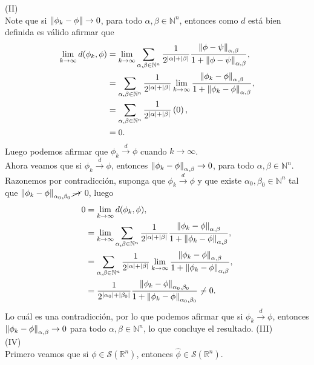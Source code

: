 \begin{homeworkProblem}
\begin{solution}
    (II)\\
    Note que si $\left\|\phi_{k}-\phi\right\|\to 0$, para todo $\alpha,\beta\in\mathbb{N}^{n}$, entonces como $d$ está bien definida es válido afirmar que
    \begin{align*}
      \lim_{k \to \infty}d(\phi_{k},\phi)&=\lim_{k \to \infty}\sum_{\alpha,\beta\in\mathbb{N}^{n}}\frac{1}{2^{|\alpha|+|\beta|}}\frac{\left\|\phi-\psi\right\|_{\alpha,\beta}}{1+\left\|\phi-\psi\right\|_{\alpha,\beta}},\\
      &=\sum_{\alpha,\beta\in\mathbb{N}^{n}}\frac{1}{2^{|\alpha|+|\beta|}}\lim_{k \to \infty}\frac{\left\|\phi_{k}-\phi\right\|_{\alpha,\beta}}{1+\left\|\phi_{k}-\phi\right\|_{\alpha,\beta}},\\
      &=\sum_{\alpha,\beta\in\mathbb{N}^{n}}\frac{1}{2^{|\alpha|+|\beta|}}\left( 0 \right),\\
      &=0.
    \end{align*}
    Luego podemos afirmar que $\phi_{k}\overset{d}{\to}\phi$ cuando $k\to\infty$.\\
    Ahora veamos que si $\phi_{k}\overset{d}{\to}\phi$, entonces $\left\|\phi_{k}-\phi\right\|_{\alpha,\beta}\to 0$, para todo $\alpha,\beta\in\mathbb{N}^{n}$.\\
    Razonemos por contradicción, suponga que $\phi_k\overset{d}{\to}\phi$ y que existe $\alpha_{0},\beta_{0}\in\mathbb{N}^{n}$ tal que $\left\|\phi_{k}-\phi\right\|_{\alpha_{0},\beta_{0}}\cancel{\to}$ $0$, luego
    \begin{align*}
      0 &= \lim_{k \to \infty}d(\phi_{k},\phi),\\
      &=\lim_{k \to \infty}\sum_{\alpha,\beta\in\mathbb{N}^{n}}\frac{1}{2^{|\alpha|+|\beta|}}\frac{\left\|\phi_{k}-\phi\right\|_{\alpha,\beta}}{1+\left\|\phi_{k}-\phi\right\|_{\alpha,\beta}},\\
      &=\sum_{\alpha,\beta\in\mathbb{N}^{n}}\frac{1}{2^{|\alpha|+|\beta|}}\lim_{k \to \infty}\frac{\left\|\phi_{k}-\phi\right\|_{\alpha,\beta}}{1+\left\|\phi_k-\phi\right\|_{\alpha,\beta}},\\
      &=\frac{1}{2^{|\alpha_{0}|+|\beta_{0}|}}\frac{\left\|\phi_{k}-\phi\right\|_{\alpha_0,\beta_0}}{1+\left\|\phi_k-\phi\right\|_{\alpha_0,\beta_0}}\neq 0.
    \end{align*}
    Lo cuál es una contradicción, por lo que podemos afirmar que si $\phi_{k}\overset{d}{\to}\phi$, entonces $\left\|\phi_k-\phi\right\|_{\alpha,\beta}\to 0$ para todo $\alpha,\beta\in\mathbb{N}^{n}$, lo que concluye el resultado.
    (III)\\
    (IV)\\
    Primero veamos que si $\phi\in\mathcal{S}(\mathbb{R}^n)$, entonces $\hat{\phi}\in\mathcal{S}(\mathbb{R}^n)$.\\

\end{solution}
\end{homeworkProblem}
